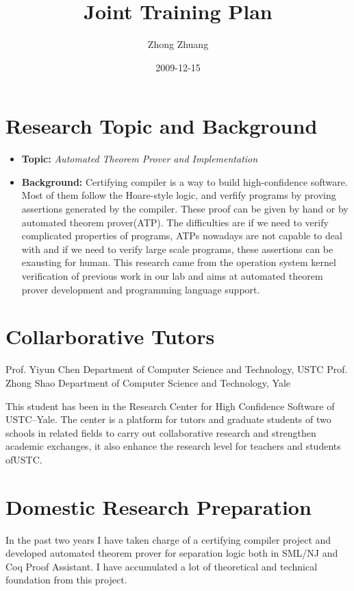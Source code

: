 \documentclass{article}
\begin{document}
\title{Joint Training Plan}
\author{Zhong Zhuang}
\date{2009-12-15 }
\maketitle



\section{Research Topic and Background}
\label{sec-1}

\begin{itemize}
\item \textbf{Topic:} \emph{Automated Theorem Prover and Implementation}
\item \textbf{Background:} Certifying compiler is a way to build high-confidence software. Most of them follow the Hoare-style logic, 
    and verfify programs by proving assertions generated by the compiler. These proof can be given by hand or by 
    automated theorem prover(ATP). The difficulties are if we need to verify complicated 
    properties of programs, ATPs nowadays are not capable to deal with and if we need to 
    verify large scale programs, these assertions can be exausting for human. This research 
    came from the operation system kernel verification of previous work in our lab and aims at
    automated theorem prover development and programming language support.
\end{itemize}
\section{Collarborative Tutors}
\label{sec-2}

  Prof. Yiyun Chen  Department of Computer Science and Technology, USTC
  Prof. Zhong Shao  Department of Computer Science and Technology, Yale

  This student has been in the Research Center for High Confidence Software of
  USTC--Yale. The center is a platform for tutors and graduate students of two
  schools in related fields to carry out collaborative research and strengthen
  academic exchanges, it also enhance the research level for teachers and students
  ofUSTC.
\section{Domestic Research Preparation}
\label{sec-3}

  In the past two years I have taken charge of a certifying compiler project and developed 
  automated theorem prover for separation logic both in SML/NJ and Coq Proof Assistant. 
  I have accumulated a lot of theoretical and technical foundation from this project.
\end{document}
